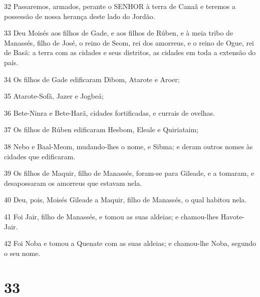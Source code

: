 \par 32 Passaremos, armados, perante o SENHOR à terra de Canaã e teremos a possessão de nossa herança deste lado do Jordão.
\par 33 Deu Moisés aos filhos de Gade, e aos filhos de Rúben, e à meia tribo de Manassés, filho de José, o reino de Seom, rei dos amorreus, e o reino de Ogue, rei de Basã: a terra com as cidades e seus distritos, as cidades em toda a extensão do país.
\par 34 Os filhos de Gade edificaram Dibom, Atarote e Aroer;
\par 35 Atarote-Sofã, Jazer e Jogbeá;
\par 36 Bete-Ninra e Bete-Harã, cidades fortificadas, e currais de ovelhas.
\par 37 Os filhos de Rúben edificaram Hesbom, Eleale e Quiriataim;
\par 38 Nebo e Baal-Meom, mudando-lhes o nome, e Sibma; e deram outros nomes às cidades que edificaram.
\par 39 Os filhos de Maquir, filho de Manassés, foram-se para Gileade, e a tomaram, e desapossaram os amorreus que estavam nela.
\par 40 Deu, pois, Moisés Gileade a Maquir, filho de Manassés, o qual habitou nela.
\par 41 Foi Jair, filho de Manassés, e tomou as suas aldeias; e chamou-lhes Havote-Jair.
\par 42 Foi Noba e tomou a Quenate com as suas aldeias; e chamou-lhe Noba, segundo o seu nome.

\chapter{33}

